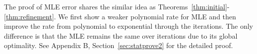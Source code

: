 \documentclass[journal]{IEEEtran}
\theoremstyle{definition}
\theoremstyle{definition}
\begin{document}
The proof of MLE error shares the similar idea as Theorems~\ref{thm:initial}-\ref{thm:refinement}. We first show a weaker polynomial rate for MLE and then improve the rate from polynomial to exponential through the iterations. The only difference is that the MLE remains the same over iterations due to its global optimality. See Appendix B, Section~\ref{sec:statprove2} for the detailed proof.

%
%



%
%
\end{document}
